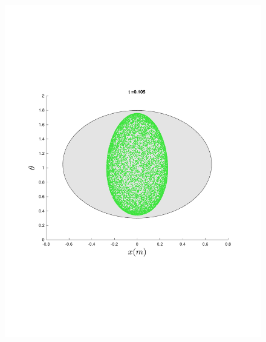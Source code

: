 \begin{figure}
{\begin{minipage}{0.5\textwidth}
\begin{minipage}[b]{0.5\textwidth}
        \includegraphics[width=\textwidth]{figures/method/FunnelSimOverlaid15funnel-1y-theta}
      \end{minipage}%
      \\
      \begin{minipage}[b]{0.5\textwidth}

\end{minipage}
\end{minipage}}
\end{figure}
